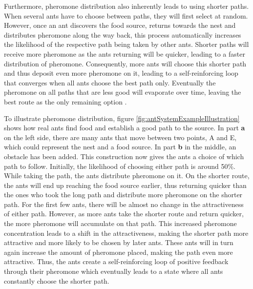 Furthermore, pheromone distribution also inherently leads to using shorter paths. 
When several ants have to choose between paths, they will first select at random.
However, once an ant discovers the food source, returns towards the nest and distributes pheromone along the way back, this process automatically increases the likelihood of the respective path being taken by other ants.
Shorter paths will receive more pheromone as the ants returning will be quicker, leading to a faster distribution of pheromone.
Consequently, more ants will choose this shorter path and thus deposit even more pheromone on it, leading to a self-reinforcing loop that converges when all ants choose the best path only.
Eventually the pheromone on all paths that are less good will evaporate over time, leaving the best route as the only remaining option \cite{gendreau_handbook_2010, dorigo_ant_1996}.

To illustrate pheromone distribution, figure \ref{fig:antSystemExampleIllustration} shows how real ants find food and establish a good path to the source. 
In part \textbf{a} on the left side, there are many ants that move between two points, A and E, which could represent the nest and a food source.
In part \textbf{b} in the middle, an obstacle has been added.
This construction now gives the ants a choice of which path to follow. 
Initially, the likelihood of choosing either path is around 50\%.
While taking the path, the ants distribute pheromone on it. 
On the shorter route, the ants will end up reaching the food source earlier, thus returning quicker than the ones who took the long path and distribute more pheromone on the shorter path.
For the first few ants, there will be almost no change in the attractiveness of either path.
However, as more ants take the shorter route and return quicker, the more pheromone will accumulate on that path.
This increased pheromone concentration leads to a shift in the attractiveness, making the shorter path more attractive and more likely to be chosen by later ants.
These ants will in turn again increase the amount of pheromone placed, making the path even more attractive.
Thus, the ants create a self-reinforcing loop of positive feedback through their pheromone which eventually leads to a state where all ants constantly choose the shorter path.


